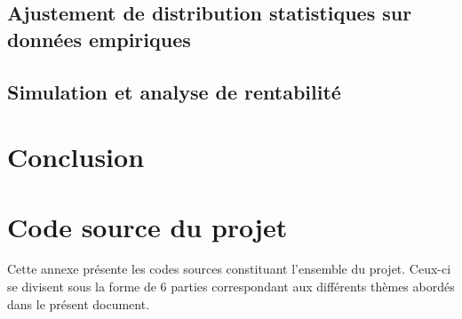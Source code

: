 \documentclass{report}
\begin{document}
\section{Ajustement de distribution statistiques sur données empiriques}

\section{Simulation et analyse de rentabilité}

\chapter*{Conclusion}




\appendix
\chapter{Code source du projet}
Cette annexe présente les codes sources constituant l'ensemble du projet. Ceux-ci se divisent sous la forme de 6 parties correspondant aux différents thèmes abordés dans le présent document. \\

\label{src:Benchmark}

\label{src:CaseStudyDevQ1}

\label{src:CaseStudyDevQ2}

\label{src:CaseStudyDevQ3}

\label{src:CaseStudyDevQ4}

\label{src:CaseStudyDevQ5}

\label{src:CaseStudyDevQ6}
\end{document}
